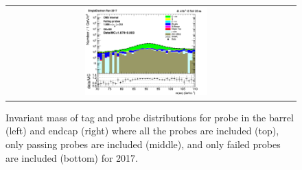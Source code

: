 \begin{figure}[htp]
\begin{center}
\begin{tabular}{cc}
      \includegraphics[width=0.45\textwidth]{figures/Zprime/2017/ScaleFactor/SameSign/nominal/stack_mee_Endcap_fail_PUW.png}
    \end{tabular}
    \caption{Invariant mass of tag and probe distributions for probe in the barrel (left) and endcap (right) where all the probes are included (top), only passing probes are included (middle), and only failed probes are included (bottom) for 2017.}
    \label{fig:SS_nominal_mee_2017}
  \end{center}
\end{figure}
